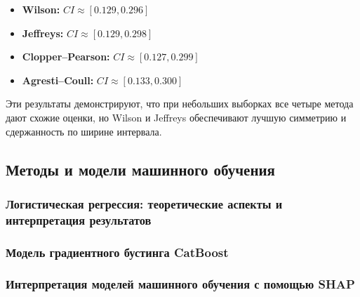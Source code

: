 \begin{itemize}
    \item \textbf{Wilson:} $CI \approx [0.129, 0.296]$
    \item \textbf{Jeffreys:} $CI \approx [0.129, 0.298]$
    \item \textbf{Clopper–Pearson:} $CI \approx [0.127, 0.299]$
    \item \textbf{Agresti–Coull:} $CI \approx [0.133, 0.300]$
\end{itemize}

Эти результаты демонстрируют, что при небольших выборках все четыре метода дают схожие оценки, но Wilson и Jeffreys обеспечивают лучшую симметрию и сдержанность по ширине интервала.

\subsection{Методы и модели машинного обучения}
\subsubsection{Логистическая регрессия: теоретические аспекты и интерпретация результатов}
\subsubsection{Модель градиентного бустинга CatBoost}
\subsubsection{Интерпретация моделей машинного обучения с помощью SHAP}
\clearpage